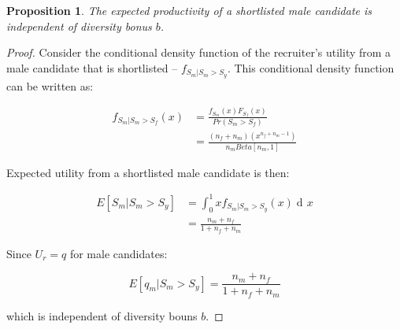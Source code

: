 \documentclass[11pt]{article}
\DeclareMathOperator{\di}{d\!}
\newtheorem{proposition}{Proposition}
\begin{document}
\begin{proposition}\label{prop_male_exp_qual}
    The expected productivity of a shortlisted male candidate is independent of diversity bonus $b$.
\end{proposition}
\begin{proof}
    Consider the conditional density function of the recruiter's utility from a male candidate that is shortlisted --  $f_{S_m|S_m>S_y}$. This conditional density function can be written as:

    \begin{align*}
        f_{S_m|S_m>S_f}(x) & = \frac{f_{S_m}(x)F_{S_f}(x) }{Pr(S_m > S_f)}     \\
                           & = \frac{(n_f+n_m)(x^{n_f+n_m-1})}{n_mBeta[n_m,1]}
    \end{align*}

    Expected utility from a shortlisted male candidate is then:

    \begin{align*}
        E[S_m|S_m > S_y] & = \int_0^1{xf_{S_m|S_m>S_y}(x) \di x} \\
                         & = \frac{n_m + n_f}{1+n_f+n_m}
    \end{align*}

    Since $U_r = q$ for male candidates:

    $$E[q_m|S_m > S_y] = \frac{n_m + n_f}{1+n_f+n_m}$$

    which is independent of diversity bouns $b$.
\end{proof}
\end{document}
